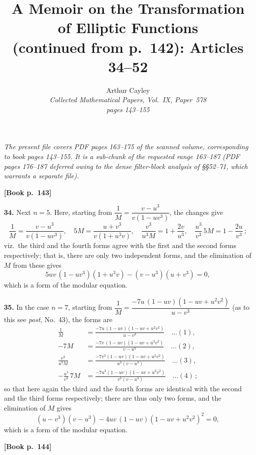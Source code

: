 \documentclass[11pt]{article}
\title{A Memoir on the Transformation of Elliptic Functions\\(continued from p.~142): Articles 34--52}
\author{Arthur Cayley\\\textit{Collected Mathematical Papers, Vol.\ IX, Paper~578}\\\textit{pages 143--155}}
\date{}
\begin{document}
\maketitle

\noindent\textit{The present file covers PDF pages 163--175 of the scanned volume,
corresponding to book pages 143--155. It is a sub-chunk of the requested range
163--187 (PDF pages 176--187 deferred owing to the dense filter-block analysis
of \S\S 52--71, which warrants a separate file).}

\bigskip

\noindent\textbf{[Book p.~143]}

\medskip

\textbf{34.} Next $n=5$. Here, starting from $\dfrac{1}{M}=\dfrac{v-u^3}{v(1-uv^3)}$,
the changes give
\[
\frac{1}{M}=\frac{v-u^3}{v(1-uv^3)},\quad
5M=\frac{u+v^3}{v(1+u^3 v)},\quad
\frac{v^3}{u^3 M}=1+\frac{2v}{u^3},\quad
\frac{u^3}{v^3}\,5M=1-\frac{2u}{v^3}\,;
\]
viz.\ the third and the fourth forms agree with the first and the second forms
respectively; that is, there are only two independent forms, and the elimination
of $M$ from these gives
\[
5uv\,(1-uv^3)(1+u^3 v) - (v-u^3)(u+v^3) = 0,
\]
which is a form of the modular equation.

\medskip

\textbf{35.} In the case $n=7$, starting from $\dfrac{1}{M}=\dfrac{-7u\,(1-uv)(1-uv+u^2 v^2)}{u-v^3}$
(as to this see \emph{post}, No.~43), the forms are
\begin{align*}
\frac{1}{M} &= \frac{-7u\,(1-uv)(1-uv+u^2 v^2)}{u-v^3}\quad\ldots(1),\\[4pt]
-7M &= \frac{-7v\,(1-uv)(1-uv+u^2 v^2)}{v-u^3}\quad\ldots(2),\\[4pt]
\frac{v^3}{u^3 M} &= \frac{-7v^3(1-uv)(1-uv+u^2 v^2)}{u^3(v-u^3)}\quad\ldots(3),\\[4pt]
-\frac{u^3}{v^3}\,7M &= \frac{-7u^3(1-uv)(1-uv+u^2 v^2)}{v^3(v-u^3)}\quad\ldots(4)\,;
\end{align*}
so that here again the third and the fourth forms are identical with the second
and the third forms respectively; there are thus only two forms, and the
elimination of $M$ gives
\[
(u-v^3)(v-u^3) - 4uv\,(1-uv)(1-uv+u^2 v^2)^2 = 0,
\]
which is a form of the modular equation.

\bigskip

\noindent\textbf{[Book p.~144]}

\medskip
\end{document}
